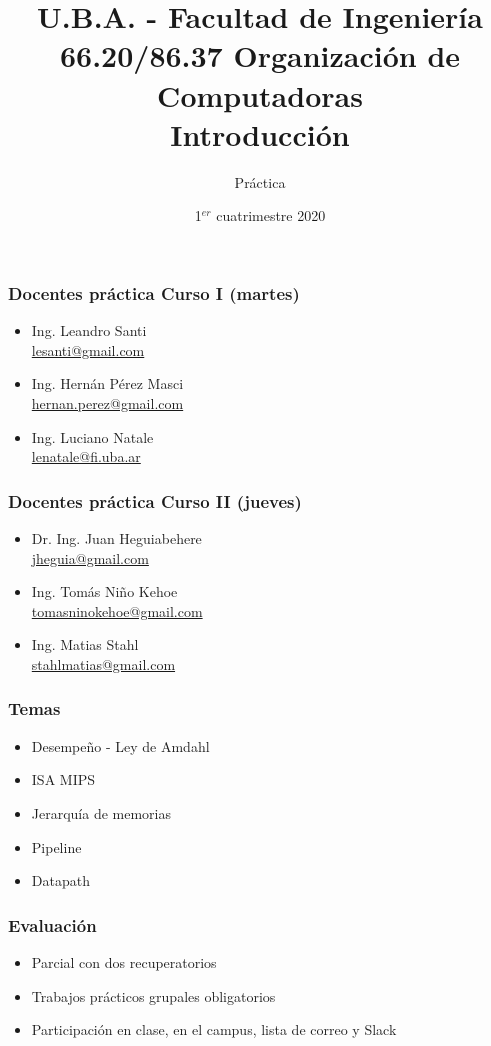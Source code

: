\documentclass{beamer}
\title[66.20/86.37]{U.B.A. - Facultad de Ingeniería\\\vspace{0.25cm} 66.20/86.37 Organización de Computadoras
  \\Introducción}
\author{Práctica}
\date{1$^{er}$ cuatrimestre 2020}
\begin{document}
\begin{frame}
\titlepage %
\end{frame}

\begin{frame}
 \frametitle{Docentes práctica Curso I (martes)}
 \begin{itemize}
  \item Ing. Leandro Santi\\ \href{mailto:lesanti@gmail.com}{lesanti@gmail.com}
  \item Ing. Hernán Pérez Masci\\ \href{hernan.perez@gmail.com}{hernan.perez@gmail.com}
  \item Ing. Luciano Natale\\ \href{lnatale@fi.uba.ar}{lenatale@fi.uba.ar}
 \end{itemize}
\end{frame}

\begin{frame}
 \frametitle{Docentes práctica Curso II (jueves)}
 \begin{itemize}
  \item Dr. Ing. Juan Heguiabehere\\ \href{mailto:jheguia@gmail.com}{jheguia@gmail.com}
  \item Ing. Tomás Niño Kehoe\\ \href{tomasninokehoe@gmail.com}{tomasninokehoe@gmail.com}
  \item Ing. Matias Stahl\\ \href{stahlmatias@gmail.com}{stahlmatias@gmail.com}
 \end{itemize}
\end{frame}

 \begin{frame}
 \frametitle{Temas}
 \begin{itemize}
  \item Desempeño - Ley de Amdahl
  \item ISA MIPS
  \item Jerarquía de memorias
  \item Pipeline
  \item Datapath
\end{itemize}
 \end{frame}

 \begin{frame}
 \frametitle{Evaluación}
 \begin{itemize}
\item Parcial con dos recuperatorios
\item Trabajos prácticos grupales obligatorios
\item Participación en clase, en el campus, lista de correo y Slack
\end{itemize}
 \end{frame}
\end{document}
